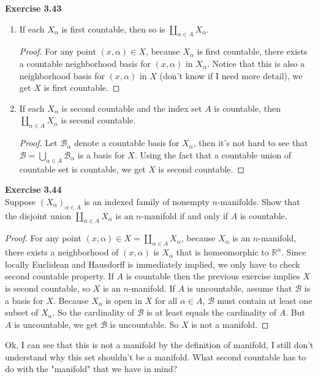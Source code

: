 \documentclass[12pt, a4paper]{article}
\theoremstyle{plain}
\newcommand{\B}{\mathscr{B}}
\newcommand{\R}{\mathbb{R}}
\newenvironment{exercise}[2][Exercise]
    { \begin{mdframed}[backgroundcolor=gray!20] \textbf{#1 #2} \\}
    {  \end{mdframed}}
\begin{document}
\begin{exercise}{3.43}
\begin{enumerate}[label=(\alph*)]
\item If each $X_\alpha$ is first countable, then so is $\coprod_{\alpha\in A}X_\alpha$.
	\begin{proof}
	For any point $(x,\alpha)\in X$, because $X_\alpha$ is first countable, there exists a countable neighborhood basis for $(x,\alpha)$ in $X_\alpha$. Notice that this is also a neighborhood basis for $(x,\alpha)$ in $X$ (don't know if I need more detail), we get $X$ is first countable.
	\end{proof}

\item If each $X_\alpha$ is second countable and the index set $A$ is countable, then $\coprod_{\alpha\in A}X_\alpha$ is second countable.
	\begin{proof}
	Let $\B_\alpha$ denote a countable basis for $X_\alpha$, then it's not hard to see that $\B=\bigcup_{\alpha\in A}\B_\alpha$ is a basis for $X$. Using the fact that a countable union of countable set is countable, we get $X$ is second countable.
	\end{proof}

\end{enumerate}
\end{exercise}

\begin{exercise}{3.44}
Suppose $(X_\alpha)_{\alpha\in A}$ is an indexed family of nonempty $n$-manifolds. Show that the disjoint union $\coprod_{\alpha\in A}X_\alpha$ is an $n$-manifold if and only if $A$ is countable.
\end{exercise}
	\begin{proof}
	For any point $(x,\alpha)\in X=\coprod_{\alpha\in A}X_\alpha$, because $X_\alpha$ is an $n$-manifold, there exists a neighborhood of $(x,\alpha)$ is $X_\alpha$ that is homeomorphic to $\R^n$. Since locally Euclidean and Hausdorff is immediately implied, we only have to check second countable property. If $A$ is countable then the previous exercise implies $X$ is second countable, so $X$ is an $n$-manifold. If $A$ is uncountable, assume that $\B$ is a basis for $X$. Because $X_\alpha$ is open in $X$ for all $\alpha\in A$, $\B$ must contain at least one subset of $X_\alpha$. So the cardinality of $\B$ is at least equals the cardinality of $A$. But $A$ is uncountable, we get $\B$ is uncountable. So $X$ is not a manifold.
	\end{proof}
	Ok, I can see that this is not a manifold by the definition of manifold, I still don't understand why this set shouldn't be a manifold. What second countable has to do with the "manifold" that we have in mind?
\end{document}
